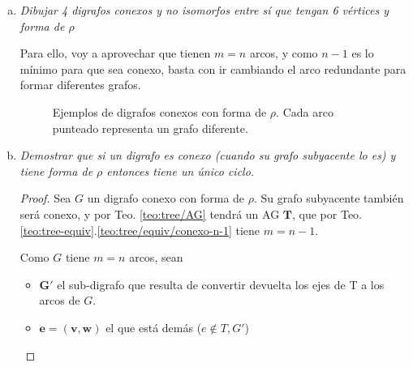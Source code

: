 \documentclass[12pt, a4paper]{report}
\theoremstyle{definition} %
\begin{document}
\begin{enumerate}[a)]
\item \textit{Dibujar 4 digrafos conexos y no isomorfos entre sí que tengan 6 vértices y forma de $\rho$}
    
    Para ello, voy a aprovechar que tienen $m = n$ arcos, y como $n - 1$ es lo mínimo para que sea conexo, basta con ir cambiando el arco redundante para formar diferentes grafos.

    \begin{figure}[H]
        \centering
        \caption*{Ejemplos de digrafos conexos con forma de $\rho$. Cada arco punteado representa un grafo diferente.}
    \end{figure}

\item \textit{Demostrar que si un digrafo es conexo (cuando su grafo subyacente lo es) y tiene forma de $\rho$ entonces tiene un único ciclo.}

    \begin{proof}
    Sea $G$ un digrafo conexo con forma de $\rho$. Su grafo subyacente también será conexo, y por Teo. \ref{teo:tree/AG} tendrá un AG $\bm{T}$, que por Teo. \ref{teo:tree-equiv}.\ref{teo:tree/equiv/conexo-n-1} tiene $m = n-1$.

    Como $G$ tiene $m = n$ arcos, sean
    \begin{itemize}
        \item $\bm{G'}$ el sub-digrafo que resulta de convertir devuelta los ejes de T a los arcos de $G$.
        \item $\bm{e = (v, w)}$ el que está demás ($e \notin T, G'$)
    \end{itemize}


\end{proof}
\end{enumerate}
\end{document}
